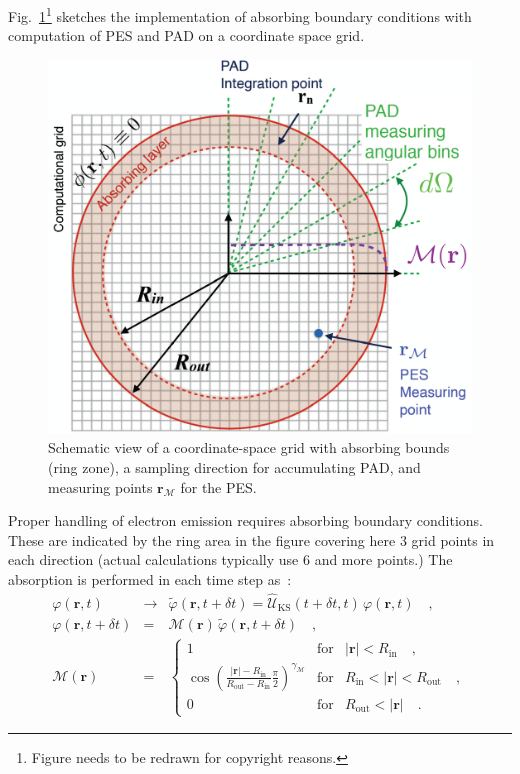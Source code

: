 \documentclass[final,1p]{elsarticle}
\newcommand{\PGRfoot}[1]{{\color{blue}\footnote{\color{blue} #1}}}
\begin{document}
Fig.~\ref{fig:mask}\PGRfoot{Figure needs to be redrawn for copyright
  reasons.} sketches the implementation of absorbing boundary
conditions with computation of PES and PAD on a coordinate space grid.
\begin{figure}[htbp]
\centerline{\includegraphics[width=0.7\linewidth]{schem_abso}}
\caption{Schematic view of a coordinate-space grid with
absorbing bounds (ring zone), a sampling direction for accumulating PAD, and
measuring points $\mathbf{r}_\mathcal{M}$ for the PES.
 \label{fig:mask}}
\end{figure}
Proper handling of electron emission requires absorbing boundary
conditions. These are indicated by the ring area in the figure
covering here 3 grid points in each direction (actual calculations
typically use 6 and more points.) The absorption is performed in each time
step as~:
\begin{subequations}
\begin{eqnarray}
  \varphi(\mathbf{r},t)
  &\longrightarrow&
  \tilde\varphi(\mathbf{r},t\!+\!\delta t)
  =
  \hat{\mathcal{U}}_\mathrm{KS}(t\!+\!\delta t,t)\, \varphi(\mathbf{r},t)
  \quad,
\label{eq:KSpart}\\
  \varphi(\mathbf{r},t\!+\!\delta t)
  &=&
  \mathcal{M}(\mathbf{r})\, \tilde\varphi(\mathbf{r},t\!+\!\delta t)
  \quad,
\label{eq:maskact}
\\
  \mathcal{M}(\mathbf r)
  &=&
  \left\{\begin{array}{lll}
  1 & \mbox{for} &|\mathbf{r}|<R_\mathrm{in}
  \quad,
  \\
  \displaystyle
 \cos\left(
  \frac{|\mathbf{r}|-R_\mathrm{in}}{R_\mathrm{out}-R_\mathrm{in}}\frac{\pi}{2}
 \right)^{\gamma_\mathcal{M}}
  &\mbox{for}&
  R_\mathrm{in}<|\mathbf{r}|<R_\mathrm{out}
  \quad,
  \\
  0 
  &\mbox{for}&
  R_\mathrm{out}<|\mathbf{r}|
  \quad.
  \end{array}\right.
\label{eq:mask}
\end{eqnarray}
\end{subequations}
\end{document}
